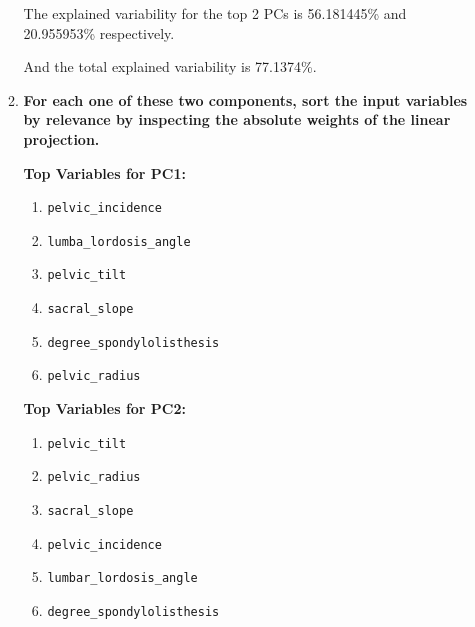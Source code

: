 \documentclass[12pt]{article}
\begin{document}
\begin{enumerate}[leftmargin=\labelsep]
\begin{enumerate}
              \vskip 0.3cm
              
            
              The explained variability for the top 2 PCs is 56.181445\% and 20.955953\% respectively.

             And the total explained variability is 77.1374\%.

        \item \textbf{For each one of these two components, sort the input variables by relevance by
              inspecting the absolute weights of the linear projection.}

              \vskip 0.3cm
              


              \begin{minipage}[t]{0.45\linewidth}
                \textbf{Top Variables for PC1:}
                \begin{enumerate}[label=\arabic*.]
                    \item \texttt{pelvic\_incidence}
                    \item \texttt{lumba\_lordosis\_angle}
                    \item \texttt{pelvic\_tilt}
                    \item \texttt{sacral\_slope}
                    \item \texttt{degree\_spondylolisthesis}
                    \item \texttt{pelvic\_radius}
                \end{enumerate}
                \end{minipage}
                \hfill
                \begin{minipage}[t]{0.45\linewidth}
                \textbf{Top Variables for PC2:}
                \begin{enumerate}[label=\arabic*.]
                    \item \texttt{pelvic\_tilt}
                    \item \texttt{pelvic\_radius}
                    \item \texttt{sacral\_slope}
                    \item \texttt{pelvic\_incidence}
                    \item \texttt{lumbar\_lordosis\_angle}
                    \item \texttt{degree\_spondylolisthesis}
                \end{enumerate}
              \end{minipage}
            


\end{enumerate}
\end{enumerate}
\end{document}
